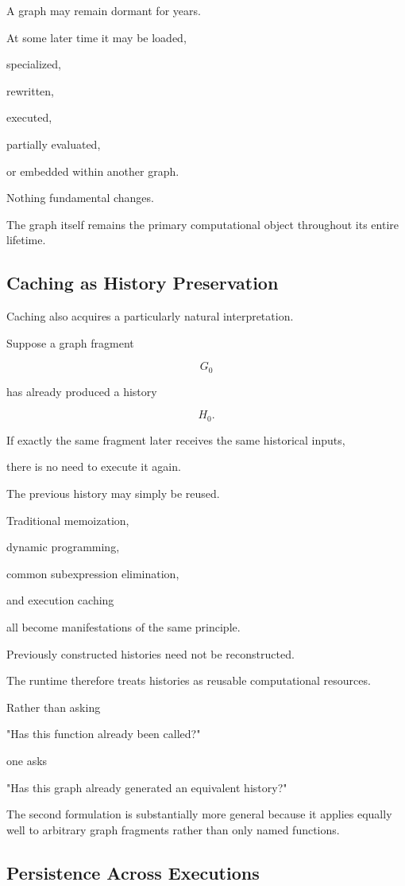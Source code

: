 \documentclass[12pt,oneside]{article}
\begin{document}
A graph may remain dormant for years.

At some later time it may be loaded,

specialized,

rewritten,

executed,

partially evaluated,

or embedded within another graph.

Nothing fundamental changes.

The graph itself remains the primary computational object throughout its entire lifetime.

\subsection{Caching as History Preservation}

Caching also acquires a particularly natural interpretation.

Suppose a graph fragment

\[
G_0
\]

has already produced a history

\[
H_0.
\]

If exactly the same fragment later receives the same historical inputs,

there is no need to execute it again.

The previous history may simply be reused.

Traditional memoization,

dynamic programming,

common subexpression elimination,

and execution caching

all become manifestations of the same principle.

Previously constructed histories need not be reconstructed.

The runtime therefore treats histories as reusable computational resources.

Rather than asking

"Has this function already been called?"

one asks

"Has this graph already generated an equivalent history?"

The second formulation is substantially more general because it applies equally well to arbitrary graph fragments rather than only named functions.

\subsection{Persistence Across Executions}
\end{document}
